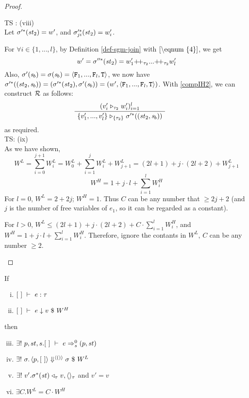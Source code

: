 \begin{proof}
\begin{itemize}
\begin{enumerate}[(i)]
\begin{itemize}
	TS : (viii)  \\
	Let $\sigma'^*(\mathit{st}_2) = w'$, and $\sigma'^*_{ji}(\mathit{st}_2) = w'_i$. 
	 
	For $\forall i \in \{1,...,l\}$, by Definition \ref{def-sgm-join} with $\eqref{\eqnum{4}}$, we get
	$$w' = \sgm''^*(\st_2) = w'_1 {\++}_{\tau_2} ... {\++}_{\tau_2} w'_l$$
	Also, $\sgm'(\s_b) = \sgm(\s_b) = \stwo$,
	we now have $\sgm'^*((\st_2,\s_b)) = (\sgm'^*(\st_2),\sgm'(\s_b)) = (w',\stwo)$. 
	With \eqref{compIH2}, we can construct $\mathcal{R}$ as follows:
	$$\PT{
		\AC{(\ValRep{v'_i}{\tau_2}{w'_i})^l_{i=1}}
		\UC{\ValRep{\Seql{v'}}{\tseq{\tau_2}}{\sgm'^*((\st_2,\s_b))}}
	}$$ as required. \\
	
	TS: (ix) \\
	As we have shown, $$W^L =  \sum_{i=0}^{j+1} W^L_i = W^L_0 + \sum_{i=1}^{j}W^L_i + W^L_{j+1} = (2l+1) +  j\cdot (2l+2) + W^L_{j+1} $$
	$$W^H = 1 + j \cdot l + \sum_{i=1}^{l} W^H_i$$ 
	For $l=0$, 	$W^L = 2 + 2j$; $W^H = 1$. Thus $C$ can be any number that $ \ge 2j+2$ (and $j$ is the number of free variables of $e_1$, so it can be regarded as a constant).
    	 
	For $l>0$, $W^L \le (2l+1) + j\cdot (2l+2) + C \cdot \sum_{i=1}^{l}W^H_i $,
	and $W^H = 1 + j \cdot l + \sum_{i=1}^{l}W^H_i$. Therefore, ignore the contants in $W^L$,  $C $ can be any number $\ge 2$.
	
	\end{itemize}

	\end{enumerate}

	\end{itemize}	
\end{proof}


\begin{cor}
	If 
	\begin{enumerate}[(i)]
		\item $[\ ] \ \vdash\  e : \tau$
		\item $\Eval{[\ ]}{e}{v}{W^H}$
	\end{enumerate}
then 
\begin{enumerate}[(i)]
	\setcounter{enumi}{2}
	\item $\exists! \ p,st,s . \Trans{[\ ]}{e}{0}{s}{(p,\st)}$
	\item $\exists! \ \sgm. \seval{p}{[\ ]}{\vunit}{\sgm}{W^L} $
	\item $\exists! \ v'. \sigma^*(\mathit{st}) \mathrel{\triangleleft_{\tau}} v,\langle \rangle_{\tau} $ and $v' = v$
	\item $ \exists C . W^L = C \cdot W^H$ 
	 
\end{enumerate}
\end{cor}

